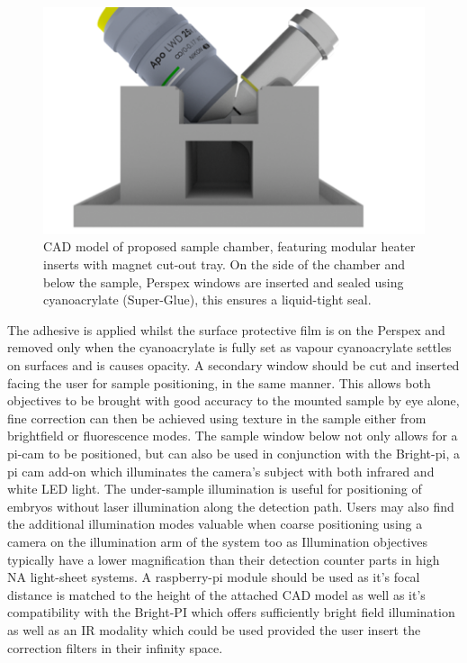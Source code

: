 \begin{figure}
    \centering
    \includegraphics{./chamber_side}
    \caption{CAD model of proposed sample chamber, featuring modular heater inserts with magnet cut-out tray.
    On the side of the chamber and below the sample, Perspex windows are inserted and sealed using cyanoacrylate (Super-Glue), this ensures a liquid-tight seal.}
    \label{fig:chamber_side}
\end{figure}

The adhesive is applied whilst the surface protective film is on the Perspex and removed only when the cyanoacrylate is fully set as vapour cyanoacrylate settles on surfaces and is causes opacity.
A secondary window should be cut and inserted facing the user for sample positioning, in the same manner.
This allows both objectives to be brought with good accuracy to the mounted sample by eye alone, fine correction can then be achieved using texture in the sample either from brightfield or fluorescence modes.
The sample window below not only allows for a pi-cam to be positioned, but can also be used in conjunction with the Bright-pi, a pi cam add-on which illuminates the camera’s subject with both infrared and white LED light.
The under-sample illumination is useful for positioning of embryos without laser illumination along the detection path.
Users may also find the additional illumination modes valuable when coarse positioning using a camera on the illumination arm of the system too as Illumination objectives typically have a lower magnification than their detection counter parts in high NA light-sheet systems.
A raspberry-pi module should be used as it’s focal distance is matched to the height of the attached CAD model as well as it’s compatibility with the Bright-PI which offers sufficiently bright field illumination as well as an IR modality which could be used provided the user insert the correction filters in their infinity space.

